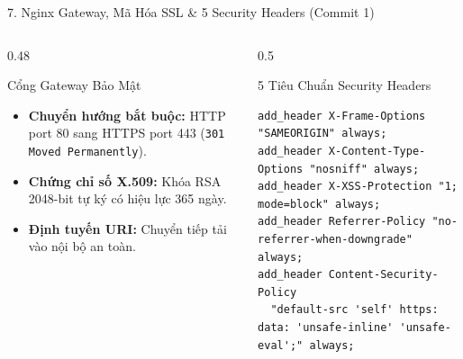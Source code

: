 \documentclass[aspectratio=169,10pt]{beamer}
\begin{document}
\begin{frame}[fragile]{7. Nginx Gateway, Mã Hóa SSL \& 5 Security Headers (Commit 1)}
    \begin{columns}[T]
        \begin{column}{0.48\textwidth}
            \begin{block}{Cổng Gateway Bảo Mật}
                \begin{itemize}
                    \item \textbf{Chuyển hướng bắt buộc:} HTTP port 80 sang HTTPS port 443 (\texttt{301 Moved Permanently}).
                    \item \textbf{Chứng chỉ số X.509:} Khóa RSA 2048-bit tự ký có hiệu lực 365 ngày.
                    \item \textbf{Định tuyến URI:} Chuyển tiếp tải vào nội bộ an toàn.
                \end{itemize}
            \end{block}
        \end{column}

        \begin{column}{0.5\textwidth}
            \begin{exampleblock}{5 Tiêu Chuẩn Security Headers}
\begin{lstlisting}
add_header X-Frame-Options "SAMEORIGIN" always;
add_header X-Content-Type-Options "nosniff" always;
add_header X-XSS-Protection "1; mode=block" always;
add_header Referrer-Policy "no-referrer-when-downgrade" always;
add_header Content-Security-Policy 
  "default-src 'self' https: data: 'unsafe-inline' 'unsafe-eval';" always;
\end{lstlisting}
            \end{exampleblock}
        \end{column}
    \end{columns}
\end{frame}
\end{document}
